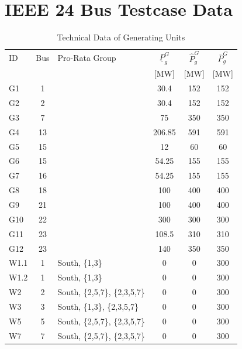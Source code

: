 \documentclass[lettersize,journal]{IEEEtran}
\begin{document}
\section{IEEE 24 Bus Testcase Data}\label{sec:appendix_ieee_testcase}
\begin{table}[H]
    \centering
    \caption{Technical Data of Generating Units}
    \label{tab:ieee24_unit_data_tech}
    \begin{tabularx}{\columnwidth}{l c X c c c}
        \toprule
        ID & Bus & Pro-Rata Group & $\underline{P}_g^G$ & $\hat{P}_g^G$ & $\overline{P}_g^G$ \\
           &      &               & [MW]       & [MW]       & [MW]       \\
        \midrule
        G1   & 1  &                   & 30.4   & 152 & 152 \\
        G2   & 2  &                   & 30.4   & 152 & 152 \\
        G3   & 7  &                   & 75     & 350 & 350 \\
        G4   & 13 &                   & 206.85 & 591 & 591 \\
        G5   & 15 &                   & 12     & 60  & 60  \\
        G6   & 15 &                   & 54.25  & 155 & 155 \\
        G7   & 16 &                   & 54.25  & 155 & 155 \\
        G8   & 18 &                   & 100    & 400 & 400 \\
        G9   & 21 &                   & 100    & 400 & 400 \\
        G10  & 22 &                   & 300    & 300 & 300 \\
        G11  & 23 &                   & 108.5  & 310 & 310 \\
        G12  & 23 &                   & 140    & 350 & 350 \\
        W1.1 & 1  & South, \{1,3\}         & 0      & 0   & 300 \\
        W1.2 & 1  & South, \{1,3\}         & 0      & 0   & 300 \\
        W2   & 2  & South, \{2,5,7\}, \{2,3,5,7\}  & 0      & 0   & 300 \\
        W3   & 3  & South, \{1,3\}, \{2,3,5,7\}       & 0      & 0   & 300 \\
        W5   & 5  & South, \{2,5,7\}, \{2,3,5,7\}  & 0      & 0   & 300 \\
        W7   & 7  & South, \{2,5,7\}, \{2,3,5,7\}  & 0      & 0   & 300 \\
        \bottomrule
    \end{tabularx}
\end{table}
\end{document}
